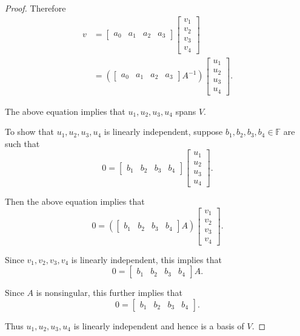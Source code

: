 \begin{proof}
Therefore
\begin{equation*}
\begin{split}
v&=\begin{bmatrix}a_0&a_1&a_2&a_3\end{bmatrix}
\begin{bmatrix}
v_1\\
v_2\\
v_3\\
v_4
\end{bmatrix}\\
&=\left(\begin{bmatrix}a_0&a_1&a_2&a_3\end{bmatrix}A^{-1}\right)
\begin{bmatrix}
u_1\\
u_2\\
u_3\\
u_4
\end{bmatrix}.
\end{split}
\end{equation*}

The above equation implies that $u_1,u_2,u_3,u_4$ spans $V$.

To show that $u_1,u_2,u_3,u_4$ is linearly independent, suppose $b_1,b_2,b_3,b_4\in\mathbb{F}$ are such that
\[
0=\begin{bmatrix}b_1&b_2&b_3&b_4\end{bmatrix}
\begin{bmatrix}
u_1\\
u_2\\
u_3\\
u_4
\end{bmatrix}.
\]

Then the above equation implies that\[
0=\left(\begin{bmatrix}b_1&b_2&b_3&b_4\end{bmatrix}
A\right)\begin{bmatrix}
v_1\\
v_2\\
v_3\\
v_4
\end{bmatrix}.
\]

Since $v_1,v_2,v_3,v_4$ is linearly independent, this implies that\[
0=\begin{bmatrix}b_1&b_2&b_3&b_4\end{bmatrix}A.
\]

Since $A$ is nonsingular, this further implies that\[
0=\begin{bmatrix}b_1&b_2&b_3&b_4\end{bmatrix}.
\]

Thus $u_1,u_2,u_3,u_4$ is linearly independent and hence is a basis of $V$.
\end{proof}


